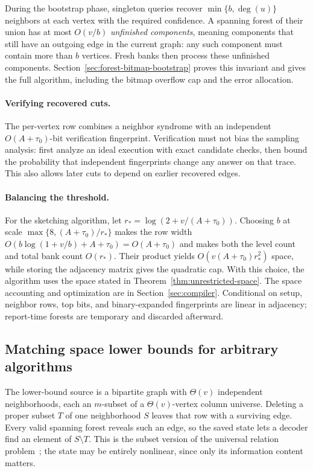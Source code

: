 \documentclass[11pt,letterpaper]{article}
\numberwithin{equation}{section}
\begin{document}
During the bootstrap phase, singleton queries recover $\min\{b,\deg(u)\}$ neighbors at each vertex with the required confidence.
A spanning forest of their union has at most $O(v/b)$ \emph{unfinished components}, meaning components that still have an outgoing edge in the current graph: any such component must contain more than $b$ vertices.
Fresh banks then process these unfinished components.
Section~\ref{sec:forest-bitmap-bootstrap} proves this invariant and gives the full algorithm, including the bitmap overflow cap and the error allocation.

\paragraph{Verifying recovered cuts.}
The per-vertex row combines a neighbor syndrome with an independent $O(A+\tau_0)$-bit verification fingerprint.
Verification must not bias the sampling analysis: first analyze an ideal execution with exact candidate checks, then bound the probability that independent fingerprints change any answer on that trace.
This also allows later cuts to depend on earlier recovered edges.

\paragraph{Balancing the threshold.}
For the sketching algorithm, let $r_*=\log(2+v/(A+\tau_0))$.
Choosing $b$ at scale $\max\{8,(A+\tau_0)/r_*\}$ makes the row width $O(b\log(1+v/b)+A+\tau_0)=O(A+\tau_0)$ and makes both the level count and total bank count $O(r_*)$.
Their product yields $O(v(A+\tau_0)r_*^2)$ space, while storing the adjacency matrix gives the quadratic cap.
With this choice, the algorithm uses the space stated in Theorem~\ref{thm:unrestricted-space}.
The space accounting and optimization are in Section~\ref{sec:compiler}.
Conditional on setup, neighbor rows, top bits, and binary-expanded fingerprints are linear in adjacency; report-time forests are temporary and discarded afterward.

\subsection{Matching space lower bounds for arbitrary algorithms}
\label{sec:graph-lower-main}

The lower-bound source is a bipartite graph with $\Theta(v)$ independent neighborhoods, each an $m$-subset of a $\Theta(v)$-vertex column universe.
Deleting a proper subset $T$ of one neighborhood $S$ leaves that row with a surviving edge.
Every valid spanning forest reveals such an edge, so the saved state lets a decoder find an element of $S\setminus T$.
This is the subset version of the universal relation problem~\cite{KNPWWY2017,NelsonYu2019}; the state may be entirely nonlinear, since only its information content matters.
\end{document}
